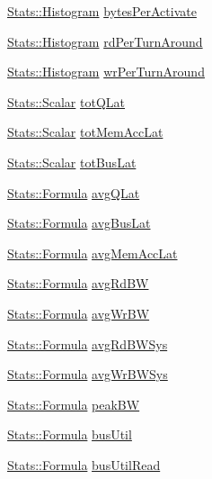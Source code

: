 \begin{DoxyCompactItemize}
\item 
\hyperlink{classStats_1_1Histogram}{Stats::Histogram} \hyperlink{classDRAMCtrl_a097e6ef9437eaed0d05c3d0881455b1a}{bytesPerActivate}
\item 
\hyperlink{classStats_1_1Histogram}{Stats::Histogram} \hyperlink{classDRAMCtrl_aff56c8c0df213e51ad714cb2b0df2de3}{rdPerTurnAround}
\item 
\hyperlink{classStats_1_1Histogram}{Stats::Histogram} \hyperlink{classDRAMCtrl_a6f8f6528076f5f3f9d56b7658368a781}{wrPerTurnAround}
\item 
\hyperlink{classStats_1_1Scalar}{Stats::Scalar} \hyperlink{classDRAMCtrl_a3eea84ec922ff55ae38676da7222cd01}{totQLat}
\item 
\hyperlink{classStats_1_1Scalar}{Stats::Scalar} \hyperlink{classDRAMCtrl_a9aa73ba3e536064d1686b6489e57a4bf}{totMemAccLat}
\item 
\hyperlink{classStats_1_1Scalar}{Stats::Scalar} \hyperlink{classDRAMCtrl_abbb23dd61d5f4a897a59ea51328ad3fd}{totBusLat}
\item 
\hyperlink{classStats_1_1Formula}{Stats::Formula} \hyperlink{classDRAMCtrl_ad594e3077a6ad256f07ab26b96b34c5f}{avgQLat}
\item 
\hyperlink{classStats_1_1Formula}{Stats::Formula} \hyperlink{classDRAMCtrl_ad2f8163270cbb3392f2e10fb6c4f78c4}{avgBusLat}
\item 
\hyperlink{classStats_1_1Formula}{Stats::Formula} \hyperlink{classDRAMCtrl_ac7abb815f3daf254a44904528d4e816b}{avgMemAccLat}
\item 
\hyperlink{classStats_1_1Formula}{Stats::Formula} \hyperlink{classDRAMCtrl_a28dfaaa96a94257709a4f53f65ff6de8}{avgRdBW}
\item 
\hyperlink{classStats_1_1Formula}{Stats::Formula} \hyperlink{classDRAMCtrl_a286267c923c741d2fb82bdf8e76ed309}{avgWrBW}
\item 
\hyperlink{classStats_1_1Formula}{Stats::Formula} \hyperlink{classDRAMCtrl_a22abe27ebad6f2dff8823abcbfd821b8}{avgRdBWSys}
\item 
\hyperlink{classStats_1_1Formula}{Stats::Formula} \hyperlink{classDRAMCtrl_ab3ccc99d9b3a33a2783095e6299af1d8}{avgWrBWSys}
\item 
\hyperlink{classStats_1_1Formula}{Stats::Formula} \hyperlink{classDRAMCtrl_af80252f1fcfad371b526eac5f9bf7e4f}{peakBW}
\item 
\hyperlink{classStats_1_1Formula}{Stats::Formula} \hyperlink{classDRAMCtrl_a32757323249e0ec2fd96e77d543fc60d}{busUtil}
\item 
\hyperlink{classStats_1_1Formula}{Stats::Formula} \hyperlink{classDRAMCtrl_a578cf14141a41ca0c302331cf1641d4a}{busUtilRead}

\end{DoxyCompactItemize}

